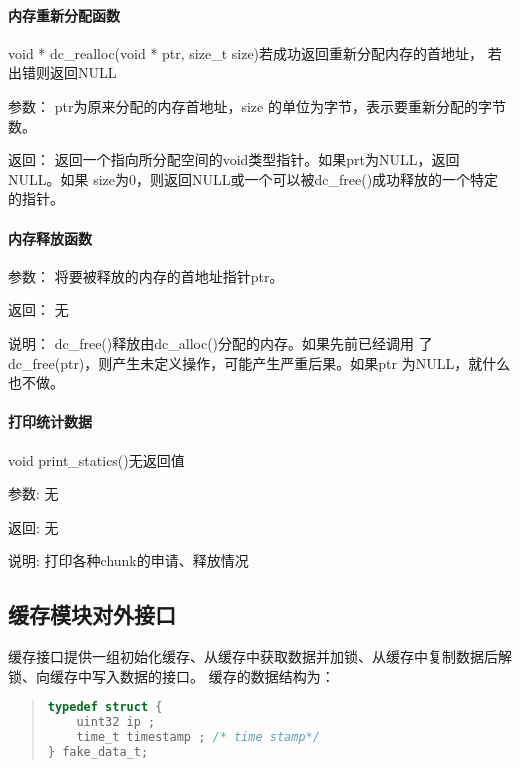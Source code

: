 \paragraph{内存重新分配函数}
	{void * dc\_realloc(void * ptr, size\_t size)}{若成功返回重新分配内存的首地址，
	若出错则返回NULL}
	\begin{compactdesc}
	\item[参数：]ptr为原来分配的内存首地址，size 的单位为字节，表示要重新分配的字节数。
	\item[返回：]返回一个指向所分配空间的void类型指针。如果prt为NULL，返回NULL。如果
	size为0，则返回NULL或一个可以被dc\_free()成功释放的一个特定的指针。
	\end{compactdesc}
\paragraph{内存释放函数}
	\begin{compactdesc}
	\item[参数：]将要被释放的内存的首地址指针ptr。
	\item[返回：]无
	\item[说明：]dc\_free()释放由dc\_alloc()分配的内存。如果先前已经调用
		了dc\_free(ptr)，则产生未定义操作，可能产生严重后果。如果ptr
		为NULL，就什么也不做。 
	\end{compactdesc}

\paragraph{打印统计数据}
{void print\_statics()}{无返回值}
	\begin{compactdesc}
	\item[参数:]无
	\item[返回:]无
	\item[说明:]打印各种chunk的申请、释放情况
	\end{compactdesc}

\subsection{缓存模块对外接口}
缓存接口提供一组初始化缓存、从缓存中获取数据并加锁、从缓存中复制数据后解锁、向缓存中写入数据的接口。
缓存的数据结构为：
\begin{quote}
\begin{lstlisting}[language={C}]
typedef struct {
	uint32 ip ;
	time_t timestamp ; /* time stamp*/
} fake_data_t;
\end{lstlisting}
\end{quote}

